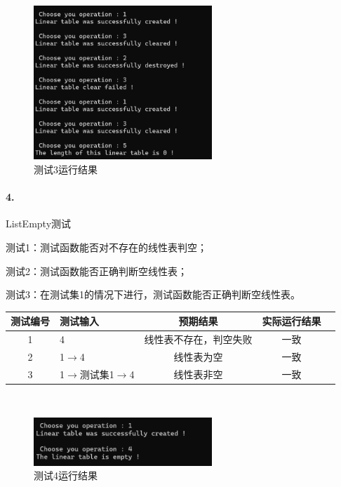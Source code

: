 \documentclass[supercite]{Experimental_Report}
\theoremstyle{definition}
\begin{document}
~\

 \begin{figure}[H]
 	\centering
 	\includegraphics[width=0.6\textwidth]{images/线性表测试3.png}
 	\caption{测试3运行结果}
 	\label{txlab}
 \end{figure}


\paragraph{ 4.}ListEmpty测试

测试1：测试函数能否对不存在的线性表判空；

测试2：测试函数能否正确判断空线性表；

测试3：在测试集1的情况下进行，测试函数能否正确判断空线性表。

\vspace{0.5em}

\begin{tabular}{|c|l|c|c|c|}
	\hline
	测试编号 & 测试输入 & 预期结果 & 实际运行结果 \\
	\hline
	1 & 4 & 线性表不存在，判空失败 & 一致 \\
	\hline
	2 & 1$\rightarrow$4 & 线性表为空 & 一致 \\
	\hline
	3 & 1$\rightarrow$测试集1$\rightarrow$4 & 线性表非空 & 一致 \\
	\hline
\end{tabular}

~\

 \begin{figure}[H]
 	\centering
 	\includegraphics[width=0.6\textwidth]{images/线性表测试4.png}
 	\caption{测试4运行结果}
 	\label{txlab}
 \end{figure}
\end{document}
